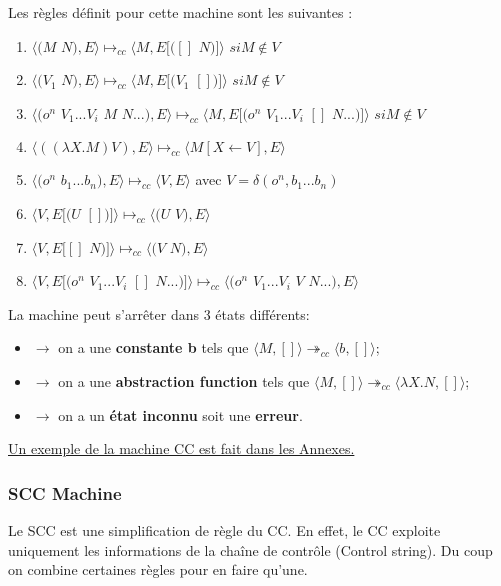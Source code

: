 \documentclass[10pt,a4paper]{article}
\begin{document}
					Les règles définit pour cette machine sont les suivantes :
					\begin{enumerate}
						\item $\langle(M$ $N),E\rangle \longmapsto_{cc} \langle M,E[([]$ $N)]\rangle$ $si M \notin V$
						\item $\langle(V_{1}$ $N),E\rangle \longmapsto_{cc}  \langle M,E[(V_{1}$ $[])]\rangle$ $ si M \notin V$
						\item $\langle(o^{n}$ $V_{1}...V_{i}$ $M$ $N ...),E\rangle \longmapsto_{cc}  
						\langle M,E[(o^{n}$ $V_{1}...V_{i}$ $[]$ $N ...)]\rangle$ $ si M \notin V$
						\item $\langle((\lambda X.M) V),E\rangle \longmapsto_{cc} \langle M[X\longleftarrow V],E\rangle$
						\item $\langle(o^{n}$ $b_{1}...b_{n}),E\rangle \longmapsto_{cc}  \langle V,E\rangle$ avec $V = \delta(o^{n},b_{1}...b_{n})$ 
						\item $\langle V,E[(U$ $[])]\rangle \longmapsto_{cc} \langle(U$ $V),E\rangle$ 
						\item $\langle V,E[[]$ $N)]\rangle \longmapsto_{cc} \langle(V$ $N),E\rangle$ 
						\item $\langle V,E[(o^{n}$ $V_{1}...V_{i}$ $[]$ $N ...)]\rangle \longmapsto_{cc} \langle(o^{n}$ $V_{1}...V_{i}$ $V$ $N ...),E\rangle$ 
					\end{enumerate}
					\bigbreak
					
					La machine peut s'arrêter dans 3 états différents:
					\begin{itemize}
						\item[]$\longrightarrow$ on a une \textbf{constante b} tels que $\langle M,[]\rangle \twoheadrightarrow_{cc} \langle b,[]\rangle$;
						\item[]$\longrightarrow$ on a une \textbf{abstraction function} tels que $\langle M,[]\rangle \twoheadrightarrow_{cc} \langle\lambda X.N,[]\rangle$;
						\item[]$\longrightarrow$ on a un \textbf{état inconnu} soit une \textbf{erreur}.
					\end{itemize}
					\hyperref[CC]{Un exemple de la machine CC est fait dans les Annexes.}
					\bigbreak
					
					
				\subsubsection{SCC Machine}
					Le SCC est une simplification de règle du CC. En effet, le CC exploite uniquement les informations de la chaîne de contrôle (Control string). Du coup on combine certaines règles pour en faire qu'une.
					\bigbreak
					
\end{document}
